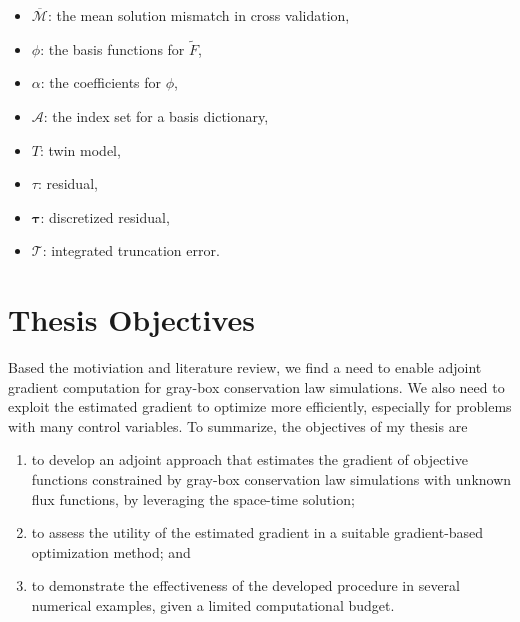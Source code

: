 \begin{itemize}
    \item $\overline{\mathcal{M}}$: the mean solution mismatch in cross validation,
    \item $\phi$: the basis functions for $\tilde{F}$,
    \item $\alpha$: the coefficients for $\phi$,
    \item $\mathcal{A}$: the index set for a basis dictionary,
    \item $T$: twin model,
    \item $\tau$: residual,
    \item $\boldsymbol{\tau}$: discretized residual,
    \item $\mathcal{T}$: integrated truncation error.
\end{itemize}



\section{Thesis Objectives}
Based the motiviation and literature review, we find a need to enable adjoint
gradient computation for gray-box conservation law simulations. We also need to 
exploit the estimated gradient to optimize more efficiently, 
especially for problems with many control variables. 
To summarize, the objectives of my thesis are
\begin{enumerate}
    \item to develop an adjoint approach that estimates the gradient of objective functions
          constrained by gray-box conservation law simulations with unknown flux functions,
          by leveraging the space-time solution;
    \item to assess the utility of the estimated gradient in a suitable 
          gradient-based optimization method; and
    \item to demonstrate the effectiveness of the developed procedure in several numerical examples,
          given a limited computational budget.
\end{enumerate}


